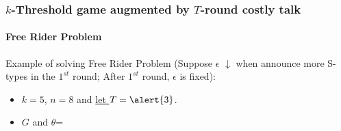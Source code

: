 \documentclass[8pt]{beamer}
\begin{document}
\begin{frame}
  \frametitle{$k$-Threshold game augmented by $T$-round costly talk}
  \framesubtitle{Free Rider Problem}
Example of solving Free Rider Problem (Suppose $\epsilon$ \alert{$\downarrow$} when announce \alert{more} S-types in the \alert{$1^{st}$} round;  After $1^{st}$ round, $\epsilon$ is fixed):
\begin{itemize}
\item $k=5$, $n=8$ and \underline{let $T=\alert{3}$}.
\item $G$ and $\theta$=
\begin{center}
\end{center}
\end{itemize}


\end{frame}
\end{document}
